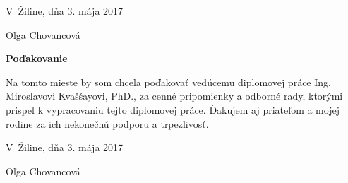 \vspace{2em}

\noindent
V~Žiline, dňa 3. mája 2017

\hfill
Oľga Chovancová

\newpage


\newpage

\centerline{\bf Poďakovanie}
\vspace{2em}
\noindent

\bigskip

Na tomto mieste by som chcela poďakovať vedúcemu diplomovej práce Ing. Miroslavovi Kvaššayovi, PhD.,  za cenné pripomienky a odborné rady, ktorými prispel k vypracovaniu tejto diplomovej práce. Ďakujem aj priateľom a mojej rodine za ich nekonečnú podporu a trpezlivosť. 

\vspace{2em}

\noindent
V~Žiline, dňa 3. mája 2017

\hfill Oľga Chovancová